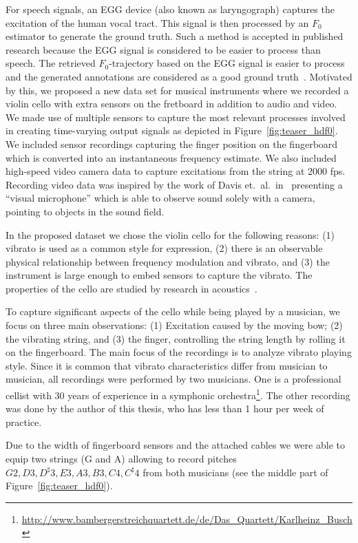 For speech signals, an EGG device (also known as laryngograph) captures the excitation of the human vocal tract. 
This signal is then processed by an $F_0$ estimator to generate the ground truth. 
Such a method is accepted in published research because the EGG signal is considered to be easier to process than speech. 
The retrieved $F_0$-trajectory based on the EGG signal is easier to process and the generated annotations are considered as a good ground truth~\cite{pirker11, babacan13}.
Motivated by this, we proposed a new data set for musical instruments where we recorded a violin cello with extra sensors on the fretboard in addition to audio and video.
We made use of multiple sensors to capture the most relevant processes involved in creating time-varying output signals as depicted in Figure~\ref{fig:teaser_hdf0}.
We included sensor recordings capturing the finger position on the fingerboard which is converted into an instantaneous frequency estimate.
We also included high-speed video camera data to capture excitations from the string at 2000 fps.
Recording video data was inspired by the work of Davis et.\ al.\ in~\cite{Davis2014VisualMic} presenting a ``visual microphone'' which is able to observe sound solely with a camera, pointing to objects in the sound field. 
\par
In the proposed dataset we chose the violin cello for the following reasons: (1) vibrato is used as a common style for expression, (2) there is an observable physical relationship between frequency modulation and vibrato, and (3) the instrument is large enough to embed sensors to capture the vibrato. The properties of the cello are studied by research in acoustics~\cite{woodhouse04, woodhouse99}.
\par
To capture significant aspects of the cello while being played by a musician, we focus on three main observations: (1) Excitation caused by the moving bow; (2) the vibrating string, and (3) the finger, controlling the string length by rolling it on the fingerboard.
The main focus of the recordings is to analyze vibrato playing style. Since it is common that vibrato characteristics differ from musician to musician, all recordings were performed by two musicians. One is a professional cellist with 30 years of experience in a symphonic orchestra\footnote{\url{http://www.bambergerstreichquartett.de/de/Das_Quartett/Karlheinz_Busch}}.
The other recording was done by the author of this thesis, who has less than 1 hour per week of practice.
\par
Due to the width of fingerboard sensors and the attached cables we were able to equip two strings (G and A) allowing to record pitches ${G2, D3, D^\sharp3, E3, A3, B3, C4, C^\sharp4}$ from both musicians (see the middle part of Figure~\ref{fig:teaser_hdf0}).
